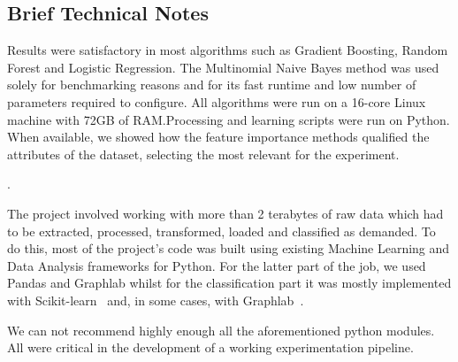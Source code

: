 \subsection{Brief Technical Notes }


Results were satisfactory in most algorithms such as Gradient Boosting, Random Forest and Logistic Regression.
The Multinomial Naive Bayes method was used solely for benchmarking reasons and for its fast runtime and low number of parameters required to configure.
All algorithms were run on a 16-core Linux machine with 72GB of RAM.\@ Processing and learning scripts were run on Python.
When available, we showed how the feature importance methods qualified the attributes of the dataset, selecting the most relevant for the experiment.

.

The project involved working with more than 2 terabytes of raw data which had to be extracted, processed, transformed, loaded and classified as demanded.
To do this, most of the project's code was built using existing Machine Learning and Data Analysis frameworks for Python.
For the latter part of the job, we used Pandas and Graphlab whilst for the classification part it was mostly implemented with Scikit-learn~\textcite{scikit-learn} and, in some cases, with Graphlab~\textcite{graphlab}.

We can not recommend highly enough all the aforementioned python modules.
All were critical in the development of a working experimentation pipeline.




